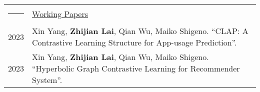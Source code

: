 \documentclass[letterpaper,11pt]{article}
\newcommand{\headingfont}{\LARGE \MakeUppercase }
\newenvironment{SectionTable}[1]{
	\renewcommand*{\arraystretch}{1.0}
	\setlength{\tabcolsep}{10pt}
	\begin{longtable}{Rp{5.2in}} 
		\rule{2.5cm}{4pt} 
		& \underline{#1} \\ %
	}
	{
	\end{longtable}\vspace{-.3cm}
}
\begin{document}
\begin{SectionTable}{\headingfont Working Papers} 
	2023 & 
	Xin Yang, \textbf{Zhijian Lai}, Qian Wu, Maiko Shigeno.
	``CLAP: A Contrastive Learning Structure for App-usage Prediction''. \\
	
	2023 & 
	Xin Yang, \textbf{Zhijian Lai}, Qian Wu, Maiko Shigeno.
	``Hyperbolic Graph Contrastive Learning for Recommender System''.
\end{SectionTable}






%	
%	
%	
%	
%	
%	
%	
\end{document}
